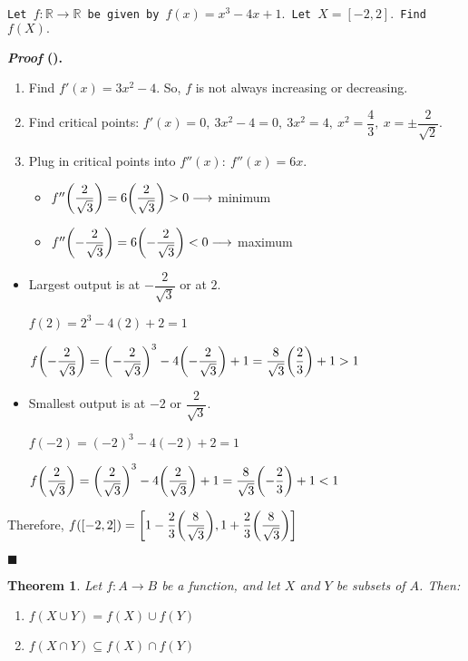 \documentclass[12pt,a4paper]{article}
\newtheorem{thm}{Theorem}[subsection]
\newcounter{nprf}[subsection]
\newenvironment*{prf}{\par\indent\textbf{\textit{Proof} (\stepcounter{nprf}\thenprf). }\par }{\par\hfill $\blacksquare$\par}
\def\R{{\mathbb{R}}}
\begin{document}
\begin{framed}
\noindent\texttt{Let $f:\R\to\R$ be given by $f(x)=x^3-4x+1.$ Let $X=[-2,2].$ Find $f(X).$}
\begin{prf}
	\begin{enumerate}
		\item[\ding{172}] Find $f'(x)=3x^2-4.$ So, $f$ is not always increasing or decreasing.
		\item[\ding{173}] Find critical points: $f'(x)=0,\ 3x^2-4=0,\ 3x^2=4,\ x^2=\dfrac{4}{3},\ x=\pm\dfrac{2}{\sqrt{2}}.$
		\item[\ding{174}] Plug in critical points into $f''(x):\ f''(x)=6x.$
		\begin{itemize}
			\item $f''\qty(\dfrac{2}{\sqrt{3}})=6\qty(\dfrac{2}{\sqrt{3}})>0\longrightarrow$ minimum
			\item $f''\qty(-\dfrac{2}{\sqrt{3}})=6\qty(-\dfrac{2}{\sqrt{3}})<0\longrightarrow$ maximum
		\end{itemize}
	\end{enumerate}
	\begin{itemize}
		\item Largest output is at $-\dfrac{2}{\sqrt{3}}$ or at $2$.\par $f(2)=2^3-4(2)+2=1$\par $f\qty(-\dfrac{2}{\sqrt{3}})=\qty(-\dfrac{2}{\sqrt{3}})^3-4\qty(-\dfrac{2}{\sqrt{3}})+1=\dfrac{8}{\sqrt{3}}\qty(\dfrac{2}{3})+1>1$
		\item Smallest output is at $-2$ or $\dfrac{2}{\sqrt{3}}.$\par $f(-2)=(-2)^3-4(-2)+2=1$\par $f\qty(\dfrac{2}{\sqrt{3}})=\qty(\dfrac{2}{\sqrt{3}})^3-4\qty(\dfrac{2}{\sqrt{3}})+1=\dfrac{8}{\sqrt{3}}\qty(-\dfrac{2}{3})+1<1$
	\end{itemize}
	Therefore, $f([-2,2])=\qty[1-\dfrac{2}{3}\qty(\dfrac{8}{\sqrt{3}}), 1+\dfrac{2}{3}\qty(\dfrac{8}{\sqrt{3}})]$
\end{prf}	
\end{framed}
\begin{thm}
	Let $f:A\to B$ be a function, and let $X$ and $Y$ be subsets of $A$. Then: 
	\begin{enumerate}
		\item\label{thm3.1.2a} $f(X\cup Y)=f(X)\cup f(Y)$
		\item\label{thm3.1.2b} $f(X\cap Y)\subseteq f(X)\cap f(Y)$
	\end{enumerate}	
\end{thm}
\end{document}
